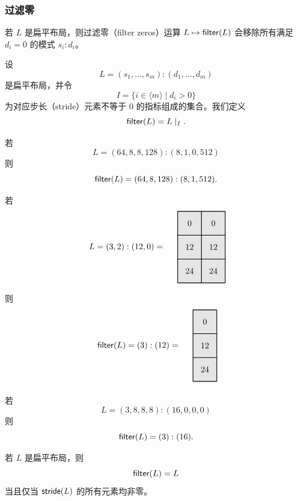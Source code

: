 \subsubsection{过滤零}
若 $L$ 是扁平布局，则过滤零（filter zeros）运算 $L \mapsto \mathsf{filter}(L)$ 会移除所有满足 $d_i = 0$ 的模式 $s_i:d_i$。
\begin{definition}\label{filterzerosdefinition}
    设
    \[L = (s_1,\dots,s_m):(d_1,\dots,d_m)\]
    是扁平布局，并令
    \[I = \{i \in \langle m \rangle \mid d_i >0 \}\]
    为对应步长（stride）元素不等于 $0$ 的指标组成的集合。我们定义
    \[
    \mathsf{filter}(L) = L \mid_I.
    \]
\end{definition}

\begin{example}
    若
    \[L = (64,8,8,128):(8,1,0,512)\]
    则
    \[
    \mathsf{filter}(L) = (64,8,128):(8,1,512).
    \]
\end{example}

\begin{example}
    若
\[
\begin{tikzpicture}[x={(0cm,-1cm)},y={(1cm,0cm)},every node/.style={minimum size=1cm, outer sep=0pt}]

\node[fill=gray!20] at (0,0) {0};
\node[fill=gray!20] at (0,1) {0};
\node[fill=gray!20] at (1,0) {12};
\node[fill=gray!20] at (1,1) {12};
\node[fill=gray!20] at (2,0) {24};
\node[fill=gray!20] at (2,1) {24};
\draw[color=black,thick,shift={(-0.5,-0.5)}] (0,0) grid (3,2);

\node[anchor=east] at (1,-1) {$L = (3,2):(12,0) =$ };
\end{tikzpicture}
\]
则
\[
\begin{tikzpicture}[x={(0cm,-1cm)},y={(1cm,0cm)},every node/.style={minimum size=1cm, outer sep=0pt}]

\node[fill=gray!20] at (0,0) {0};
\node[fill=gray!20] at (1,0) {12};
\node[fill=gray!20] at (2,0) {24};

\draw[color=black,thick,shift={(-0.5,-0.5)}] (0,0) grid (3,1);

\node[anchor=east] at (1,-1) {$\filter(L) = (3):(12) =$ };
\end{tikzpicture}
\]
\end{example}

\begin{example}
    若
    \[
    L = (3,8,8,8):(16,0,0,0)
    \]
    则
    \[
    \mathsf{filter}(L)  = (3):(16).
    \]
\end{example}

\begin{example}
    若 $L$ 是扁平布局，则
    \[
    \mathsf{filter}(L) = L
    \]
    当且仅当 $\mathsf{stride}(L)$ 的所有元素均非零。
\end{example}

